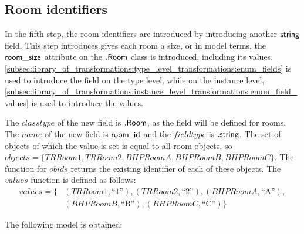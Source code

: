 \subsection{Room identifiers}
\label{sec:application:building_the_model:room_identifiers}

In the fifth step, the room identifiers are introduced by introducing another $\mathsf{string}$ field. This step introduces gives each room a size, or in model terms, the $\mathsf{room\_size}$ attribute on the $.\mathsf{Room}$ class is introduced, including its values. \cref{subsec:library_of_transformations:type_level_transformations:enum_fields} is used to introduce the field on the type level, while on the instance level, \cref{subsec:library_of_transformations:instance_level_transformations:enum_field_values} is used to introduce the values.

The $classtype$ of the new field is $.\mathsf{Room}$, as the field will be defined for rooms. The $name$ of the new field is $\mathsf{room\_\!id}$ and the $fieldtype$ is $.\mathsf{string}$. The set of objects of which the value is set is equal to all room objects, so $objects = \{TRRoom1, TRRoom2, BHPRoomA, BHPRoomB, BHPRoomC\}$. The function for $obids$ returns the existing identifier of each of these objects. The $values$ function is defined as follows:
\begin{align*}
    values = \{&(TRRoom1, \text{``1''}), (TRRoom2, \text{``2''}), (BHPRoomA, \text{``A''}), \\&(BHPRoomB, \text{``B''}), (BHPRoomC, \text{``C''})\}
\end{align*}

The following model is obtained:


